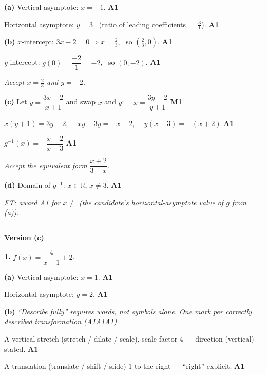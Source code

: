 \documentclass[12pt, twoside]{article}
\begin{document}
\medskip

\textbf{(a)} Vertical asymptote: $x=-1$. \hfill \textbf{A1}

Horizontal asymptote: $y=3$ \ (ratio of leading coefficients $=\tfrac{3}{1}$). \hfill \textbf{A1}

\medskip

\textbf{(b)} $x$-intercept: $3x-2=0 \Rightarrow x=\tfrac{2}{3}$, \ so $\left(\tfrac{2}{3},0\right)$. \hfill \textbf{A1}

$y$-intercept: $g(0)=\dfrac{-2}{1}=-2$, \ so $(0,-2)$. \hfill \textbf{A1}

\emph{Accept $x=\tfrac{2}{3}$ and $y=-2$.}

\medskip

\textbf{(c)} Let $y=\dfrac{3x-2}{x+1}$ and swap $x$ and $y$: \ \ $x=\dfrac{3y-2}{y+1}$ \hfill \textbf{M1}

$x(y+1)=3y-2$, \ \ $xy-3y=-x-2$, \ \ $y(x-3)=-(x+2)$ \hfill \textbf{A1}

$g^{-1}(x)=-\dfrac{x+2}{x-3}$ \hfill \textbf{A1}

\emph{Accept the equivalent form $\dfrac{x+2}{3-x}$.}

\medskip

\textbf{(d)} Domain of $g^{-1}$: $x\in\mathbb{R}$, $x\ne 3$. \hfill \textbf{A1}

\emph{FT: award A1 for $x\ne$ (the candidate's horizontal-asymptote value of $g$ from (a)).}

\bigskip\hrule\bigskip

\noindent\textbf{\large Version (c)}

\bigskip

\noindent\textbf{1.} $\displaystyle f(x)=\dfrac{4}{x-1}+2$.

\medskip

\textbf{(a)} Vertical asymptote: $x=1$. \hfill \textbf{A1}

Horizontal asymptote: $y=2$. \hfill \textbf{A1}

\medskip

\textbf{(b)} \emph{``Describe fully'' requires words, not symbols alone. One mark
per correctly described transformation (A1A1A1).}

A vertical stretch (stretch / dilate / scale), scale factor $4$ --- direction (vertical) stated. \hfill \textbf{A1}

A translation (translate / shift / slide) $1$ to the right --- ``right'' explicit. \hfill \textbf{A1}
\end{document}
